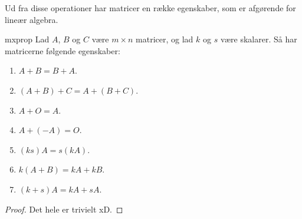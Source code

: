 %
Ud fra disse operationer har matricer en række egenskaber, som er afgørende for lineær algebra.
%
\begin{thm}{}{mxprop}
Lad $A$, $B$ og $C$ være $m \times n$ matricer, og lad $k$ og $s$ være skalarer.
Så har matricerne følgende egenskaber:
\newlength{\enumlabel}
\addtolength{\enumlabel}{\labelsep}
\begin{enumerate}[label=\Roman*, align=center, labelwidth=\enumlabel, leftmargin=!]
\item $A + B = B + A$.
\item $(A + B) + C = A + (B + C)$.
\item $A + O = A$.
\item $A + (-A) = O$.
\item $(ks)A = s(kA)$.
\item $k(A + B) = kA + kB$.
\item $(k + s)A = kA + sA$.
\end{enumerate}
\end{thm}

\begin{proof}
Det hele er trivielt xD.
\end{proof}
